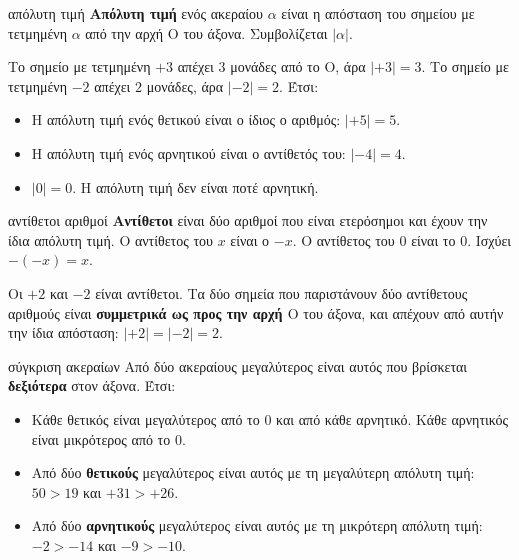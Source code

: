 \begin{orismos}{απόλυτη τιμή}
\textbf{Απόλυτη τιμή} ενός ακεραίου $\alpha$ είναι η απόσταση του σημείου με τετμημένη $\alpha$ από την αρχή $\mathrm{Ο}$ του άξονα. Συμβολίζεται $|\alpha|$.
\end{orismos}

\begin{center}
\end{center}

Το σημείο με τετμημένη $+3$ απέχει $3$ μονάδες από το $\mathrm{Ο}$, άρα $|+3|=3$. Το σημείο με τετμημένη $-2$ απέχει $2$ μονάδες, άρα $|-2|=2$. Έτσι:
\begin{itemize}[leftmargin=1.2em,itemsep=0.3ex,topsep=2pt]
\item Η απόλυτη τιμή ενός θετικού είναι ο ίδιος ο αριθμός: $|+5|=5$.
\item Η απόλυτη τιμή ενός αρνητικού είναι ο αντίθετός του: $|-4|=4$.
\item $|0|=0$. Η απόλυτη τιμή δεν είναι ποτέ αρνητική.
\end{itemize}

\begin{orismos}{αντίθετοι αριθμοί}
\textbf{Αντίθετοι} είναι δύο αριθμοί που είναι ετερόσημοι και έχουν την ίδια απόλυτη τιμή. Ο αντίθετος του $x$ είναι ο $-x$. Ο αντίθετος του $0$ είναι το $0$. Ισχύει $-(-x)=x$.
\end{orismos}

Οι $+2$ και $-2$ είναι αντίθετοι. Τα δύο σημεία που παριστάνουν δύο αντίθετους αριθμούς είναι \textbf{συμμετρικά ως προς την αρχή $\mathrm{Ο}$} του άξονα, και απέχουν από αυτήν την ίδια απόσταση: $|+2|=|-2|=2$.


\begin{kanonas}{σύγκριση ακεραίων}
Από δύο ακεραίους μεγαλύτερος είναι αυτός που βρίσκεται \textbf{δεξιότερα} στον άξονα. Έτσι:
\begin{itemize}[leftmargin=1.2em,itemsep=0.3ex,topsep=2pt]
\item Κάθε θετικός είναι μεγαλύτερος από το $0$ και από κάθε αρνητικό. Κάθε αρνητικός είναι μικρότερος από το $0$.
\item Από δύο \textbf{θετικούς} μεγαλύτερος είναι αυτός με τη μεγαλύτερη απόλυτη τιμή: $50>19$ και $+31>+26$.
\item Από δύο \textbf{αρνητικούς} μεγαλύτερος είναι αυτός με τη μικρότερη απόλυτη τιμή: $-2>-14$ και $-9>-10$.
\end{itemize}
\end{kanonas}

